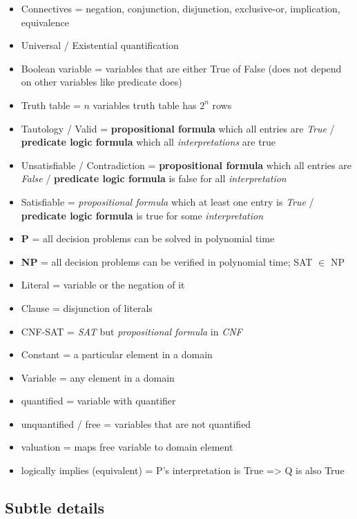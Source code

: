 \documentclass{homework}
\newcommand{\?}{\stackrel{?}{=}}
\theoremstyle{definition}
\begin{document}
\begin{itemize}
    \item Connectives = negation, conjunction, disjunction, exclusive-or, implication, equivalence
    \item Universal / Existential quantification 
    \item Boolean variable = variables that are either True of False (does not depend on other variables like predicate does)
    \item Truth table = $n$ variables truth table has $2^n$ rows\\
    \item Tautology / Valid = \textbf{propositional formula} which all entries are \textit{True} / \textbf{predicate logic formula} which all \textit{interpretations} are true
    \item Unsatisfiable / Contradiction = \textbf{propositional formula} which all entries are \textit{False} / \textbf{predicate logic formula} is false for all \textit{interpretation}
    \item Satisfiable = \textit{propositional formula} which at least one entry is \textit{True} / \textbf{predicate logic formula} is true for some \textit{interpretation}\\
    \item \textbf{P} = all decision problems can be solved in polynomial time
    \item \textbf{NP} = all decision problems can be verified in polynomial time; SAT $\in$ NP
    \item Literal = variable or the negation of it
    \item Clause = disjunction of literals
    \item CNF-SAT = \textit{SAT} but \textit{propositional formula} in \textit{CNF}\\
    \item Constant = a particular element in a domain
    \item Variable = any element in a domain
    \item quantified = variable with quantifier
    \item unquantified / free = variables that are not quantified
    \item valuation = maps free variable to domain element
    \item logically implies (equivalent) = P's interpretation is True => Q is also True
\end{itemize}

\subsection{Subtle details}
\end{document}
